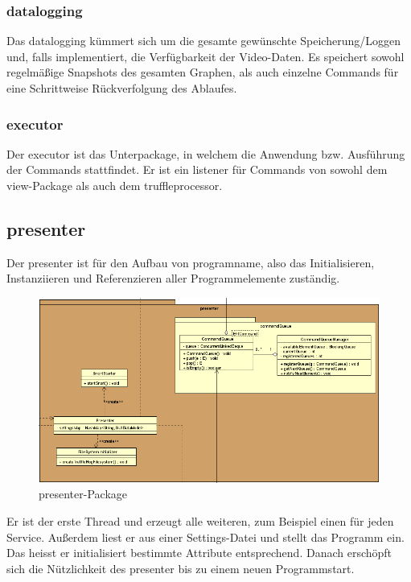     \subsubsection{datalogging}
    Das datalogging kümmert sich um die gesamte gewünschte
    Speicherung/Loggen und, falls implementiert, die Verfügbarkeit der
    Video-Daten. Es speichert sowohl regelmäßige Snapshots des gesamten
    Graphen, als auch einzelne Commands für eine Schrittweise Rückverfolgung
    des Ablaufes.

    \subsubsection{executor}
    Der executor ist das Unterpackage, in welchem die Anwendung bzw.
    Ausführung der Commands stattfindet. Er ist ein \gls{listener} für Commands
    von sowohl dem view-Package als auch dem truffleprocessor.


\subsection{presenter}


Der presenter ist für den Aufbau von \gls{programname}, also das
Initialisieren, Instanziieren und Referenzieren aller Programmelemente zuständig.

\begin{figure}[H]
  \centering
  \includegraphics[width=\textwidth]{../diagramimages/presenter.png}
  \caption{presenter-Package}
\end{figure}

Er ist der erste Thread und erzeugt alle weiteren, zum Beispiel einen für jeden
Service. Außerdem liest er aus einer Settings-Datei und stellt das Programm ein.
Das heisst er initialisiert bestimmte Attribute entsprechend. Danach erschöpft
sich die Nützlichkeit des presenter bis zu einem neuen Programmstart.



